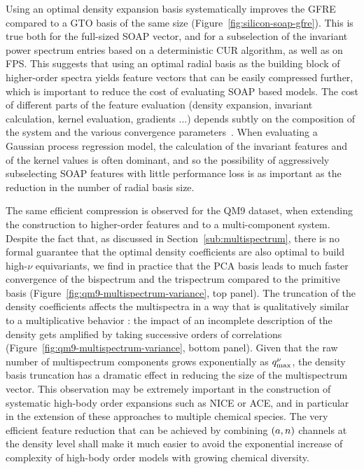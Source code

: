 Using an optimal density expansion basis systematically improves the GFRE compared to a GTO basis of the same size (Figure~\ref{fig:silicon-soap-gfre}).  
This is true both for the full-sized SOAP vector, and for a subselection of the invariant power spectrum entries based on a deterministic CUR algorithm, as well as on FPS.
This suggests that using an optimal radial basis as the building block of higher-order spectra yields feature vectors that can be easily compressed further, which is important to reduce the cost of evaluating SOAP based models.
The cost of different parts of the feature evaluation (density expansion, invariant calculation, kernel evaluation, gradients ...)  depends subtly on the composition of the system and the various convergence parameters~\cite{musil2021efficient}. When evaluating a Gaussian process regression model, the calculation of the invariant features and of the kernel values is often dominant, and so the possibility of aggressively subselecting SOAP features with little performance loss is as important as the reduction in the number of radial basis size.


The same efficient compression is observed for the QM9 dataset, when extending the construction to higher-order features and to a multi-component system. Despite the fact that, as discussed in Section~\ref{sub:multispectrum}, there is no formal guarantee that the optimal density coefficients are also optimal to build high-$\nu$ equivariants,
we find in practice that the PCA basis leads to much faster convergence of the bispectrum and the trispectrum compared to the primitive basis (Figure~\ref{fig:qm9-multispectrum-variance}, top panel). 
The truncation of the density coefficients affects the multispectra in a way that is qualitatively similar to a multiplicative behavior 
: the impact of an incomplete description of the density gets amplified by taking successive orders of correlations (Figure~\ref{fig:qm9-multispectrum-variance}, bottom panel). 
Given that the raw number of multispectrum components grows exponentially as $q_\mathrm{max}^\nu$, the density basis truncation has a dramatic effect in reducing the size of the multispectrum vector.  This observation may be extremely important in the construction of systematic high-body order expansions such as NICE or ACE, and in particular in the extension of these approaches to multiple chemical species.
The very efficient feature reduction that can be achieved by combining $(a,n)$ channels at the density level shall make it much easier to avoid the exponential increase of complexity of high-body order models with growing chemical diversity. 

